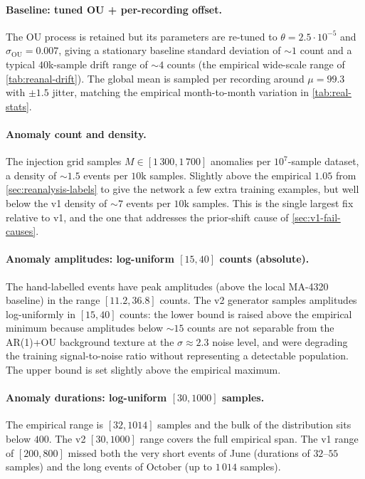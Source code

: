 \paragraph{Baseline: tuned OU + per-recording offset.} The OU process
is retained but its parameters are re-tuned to $\theta = 2.5 \cdot
10^{-5}$ and $\sigma_{\mathrm{OU}} = 0.007$, giving a stationary
baseline standard deviation of $\sim 1$ count and a typical
$40$k-sample drift range of $\sim 4$ counts (the empirical wide-scale
range of \cref{tab:reanal-drift}). The global mean is sampled per
recording around $\mu = 99.3$ with $\pm 1.5$ jitter, matching the
empirical month-to-month variation in \cref{tab:real-stats}.

\paragraph{Anomaly count and density.} The injection grid samples
$M \in [1\,300, 1\,700]$ anomalies per $10^{7}$-sample dataset, a
density of $\sim 1.5$ events per $10\text{k}$ samples. Slightly above
the empirical $1.05$ from \cref{sec:reanalysis-labels} to give the
network a few extra training examples, but well below the v1 density
of $\sim 7$ events per $10\text{k}$ samples. This is the single
largest fix relative to v1, and the one that addresses the
prior-shift cause of \cref{sec:v1-fail-causes}.

\paragraph{Anomaly amplitudes: log-uniform $[15, 40]$ counts
(absolute).} The hand-labelled events have peak amplitudes (above the
local MA-4320 baseline) in the range $[11.2, 36.8]$ counts. The v2
generator samples amplitudes log-uniformly in $[15, 40]$ counts: the
lower bound is raised above the empirical minimum because amplitudes
below $\sim 15$ counts are not separable from the AR(1)+OU background
texture at the $\sigma \approx 2.3$ noise level, and were degrading
the training signal-to-noise ratio without representing a detectable
population. The upper bound is set slightly above the empirical
maximum.

\paragraph{Anomaly durations: log-uniform $[30, 1000]$ samples.} The
empirical range is $[32, 1014]$ samples and the bulk of the
distribution sits below $400$. The v2 $[30, 1000]$ range covers the
full empirical span. The v1 range of $[200, 800]$ missed both the very
short events of June (durations of $32$--$55$ samples) and the long
events of October (up to $1\,014$ samples).

